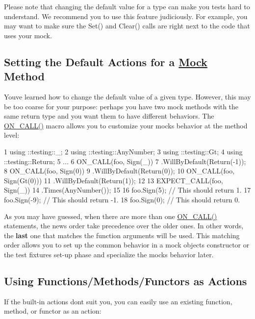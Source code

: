 Please note that changing the default value for a type can make you tests hard to understand. We recommend you to use this feature judiciously. For example, you may want to make sure the {\ttfamily Set()} and {\ttfamily Clear()} calls are right next to the code that uses your mock.

\subsection*{Setting the Default Actions for a \hyperlink{class_mock}{Mock} Method}

You\textquotesingle{}ve learned how to change the default value of a given type. However, this may be too coarse for your purpose\+: perhaps you have two mock methods with the same return type and you want them to have different behaviors. The {\ttfamily \hyperlink{gmock-spec-builders_8h_a5b12ae6cf84f0a544ca811b380c37334}{O\+N\+\_\+\+C\+A\+L\+L()}} macro allows you to customize your mock\textquotesingle{}s behavior at the method level\+:


\begin{DoxyCode}
1 using ::testing::\_;
2 using ::testing::AnyNumber;
3 using ::testing::Gt;
4 using ::testing::Return;
5 ...
6   ON\_CALL(foo, Sign(\_))
7       .WillByDefault(Return(-1));
8   ON\_CALL(foo, Sign(0))
9       .WillByDefault(Return(0));
10   ON\_CALL(foo, Sign(Gt(0)))
11       .WillByDefault(Return(1));
12 
13   EXPECT\_CALL(foo, Sign(\_))
14       .Times(AnyNumber());
15 
16   foo.Sign(5);   // This should return 1.
17   foo.Sign(-9);  // This should return -1.
18   foo.Sign(0);   // This should return 0.
\end{DoxyCode}


As you may have guessed, when there are more than one {\ttfamily \hyperlink{gmock-spec-builders_8h_a5b12ae6cf84f0a544ca811b380c37334}{O\+N\+\_\+\+C\+A\+L\+L()}} statements, the news order take precedence over the older ones. In other words, the {\bfseries last} one that matches the function arguments will be used. This matching order allows you to set up the common behavior in a mock object\textquotesingle{}s constructor or the test fixture\textquotesingle{}s set-\/up phase and specialize the mock\textquotesingle{}s behavior later.

\subsection*{Using Functions/\+Methods/\+Functors as Actions}

If the built-\/in actions don\textquotesingle{}t suit you, you can easily use an existing function, method, or functor as an action\+:


